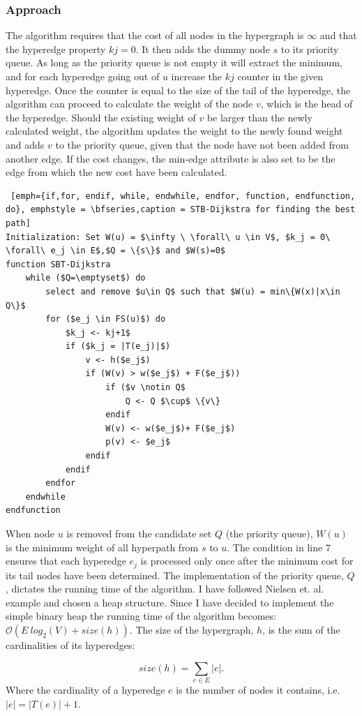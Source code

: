 \documentclass[a4paper,10pt,titlepage]{paper}
\begin{document}
\subsubsection{Approach}
The algorithm requires that the cost of all nodes in the hypergraph is $\infty$ and that the hyperedge property $kj=0$. It then adds the dummy node $s$ to its priority queue. As long as the priority queue is not empty it will extract the minimum, and for each hyperedge going out of $u$ increase the $kj$ counter in the given hyperedge. Once the counter is equal to the size of the tail of the hyperedge, the algorithm can proceed to calculate the weight of the node $v$, which is the head of the hyperedge. Should the existing weight of $v$ be larger than the newly calculated weight, the algorithm updates the weight to the newly found weight and adds $v$ to the priority queue, given that the node have not been added from another edge. If the cost changes, the min-edge attribute is also set to be the edge from which the new cost have been calculated.
\begin{lstlisting} [emph={if,for, endif, while, endwhile, endfor, function, endfunction, do}, emphstyle = \bfseries,caption = STB-Dijkstra for finding the best path]
Initialization: Set W(u) = $\infty \ \forall\ u \in V$, $k_j = 0\ \forall\ e_j \in E$,$Q = \{s\}$ and $W(s)=0$
function SBT-Dijkstra
	while ($Q=\emptyset$) do
		select and remove $u\in Q$ such that $W(u) = min\{W(x)|x\in Q\}$
		for ($e_j \in FS(u)$) do
			$k_j <- kj+1$
			if ($k_j = |T(e_j)|$) 
				v <- h($e_j$)
				if (W(v) > w($e_j$) + F($e_j$))
					if ($v \notin Q$  
						Q <- Q $\cup$ \{v\}
					endif
					W(v) <- w($e_j$)+ F($e_j$)
					p(v) <- $e_j$
				endif
			endif
		endfor
	endwhile
endfunction
\end{lstlisting}
When node $u$ is removed from the candidate set $Q$ (the priority queue), $W(u)$ is the minimum weight of all hyperpath from $s$ to $u$. The condition in line 7 ensures that each hyperedge $e_j$ is processed only once after the minimum cost for its tail nodes have been determined. The implementation of the priority queue, $Q$, dictates the running time of the algorithm. I have followed Nielsen et. al. example and chosen a heap structure. Since I have decided to implement the simple binary heap the running time of the algorithm becomes: $\mathcal{O}(E\ log_2(V) + size(h))$. The size of the hypergraph, $h$, is the sum of the cardinalities of its hyperedges:

\begin{equation}
size(h) = \displaystyle\sum_{e\in E} |e|.
\end{equation}
Where the cardinality of a hyperedge $e$ is the number of nodes it contains, i.e. $|e| = |T(e)| + 1$.\cite{Nielsen}
\end{document}
